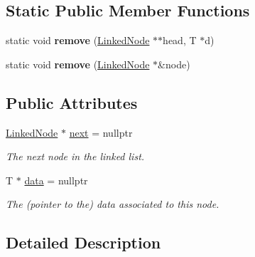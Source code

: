 \subsection*{Static Public Member Functions}
\begin{DoxyCompactItemize}
\item 
\mbox{\label{structnta_1_1utils_1_1LinkedNode_aaa66b5146c00b81176323eb51eb45eda}} 
static void {\bfseries remove} (\hyperlink{structnta_1_1utils_1_1LinkedNode}{Linked\+Node} $\ast$$\ast$head, T $\ast$d)
\item 
\mbox{\label{structnta_1_1utils_1_1LinkedNode_afc257ed0b6f655b6d8a01fbbc032dac3}} 
static void {\bfseries remove} (\hyperlink{structnta_1_1utils_1_1LinkedNode}{Linked\+Node} $\ast$\&node)
\end{DoxyCompactItemize}
\subsection*{Public Attributes}
\begin{DoxyCompactItemize}
\item 
\mbox{\label{structnta_1_1utils_1_1LinkedNode_a5a522eff45940071fc15d4327a9ed13d}} 
\hyperlink{structnta_1_1utils_1_1LinkedNode}{Linked\+Node} $\ast$ \hyperlink{structnta_1_1utils_1_1LinkedNode_a5a522eff45940071fc15d4327a9ed13d}{next} = nullptr
\begin{DoxyCompactList}\small\item\em The next node in the linked list. \end{DoxyCompactList}\item 
\mbox{\label{structnta_1_1utils_1_1LinkedNode_aceb8ef3d4d17a349d36db056d59ac6b4}} 
T $\ast$ \hyperlink{structnta_1_1utils_1_1LinkedNode_aceb8ef3d4d17a349d36db056d59ac6b4}{data} = nullptr
\begin{DoxyCompactList}\small\item\em The (pointer to the) data associated to this node. \end{DoxyCompactList}\end{DoxyCompactItemize}


\subsection{Detailed Description}

